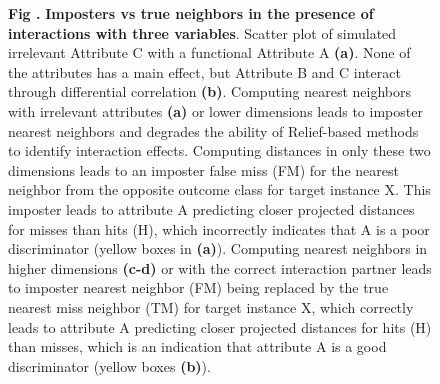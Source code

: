 \documentclass[10pt,letterpaper]{article}\usepackage[]{graphicx}\usepackage[]{color}
\begin{document}
\begin{figure}[ht!]
\begin{figure}
    \vspace{-12pt}
	\centering
\end{figure}
\noindent{}\textbf{Fig \thefigure \label{fig:2dAvC}.} \textbf{Imposters vs true neighbors in the presence of interactions with three variables}. Scatter plot of simulated irrelevant Attribute C with a functional Attribute A \textbf{(a)}. None of the attributes has a main effect, but Attribute B and C interact through differential correlation \textbf{(b)}. Computing nearest neighbors with irrelevant attributes \textbf{(a)} or lower dimensions leads to imposter nearest neighbors and degrades the ability of Relief-based methods to identify interaction effects. Computing distances in only these two dimensions leads to an imposter false miss (FM) for the nearest neighbor from the opposite outcome class for target instance X. This imposter leads to attribute A predicting closer projected distances for misses than hits (H), which incorrectly indicates that A is a poor discriminator (yellow boxes in \textbf{(a)}). Computing nearest neighbors in higher dimensions \textbf{(c-d)} or with the correct interaction partner leads to imposter nearest neighbor (FM) being replaced by the true nearest miss neighbor (TM) for target instance X, which correctly leads to attribute A predicting closer projected distances for hits (H) than misses, which is an indication that attribute A is a good discriminator (yellow boxes \textbf{(b)}).
\end{figure}
\end{document}
